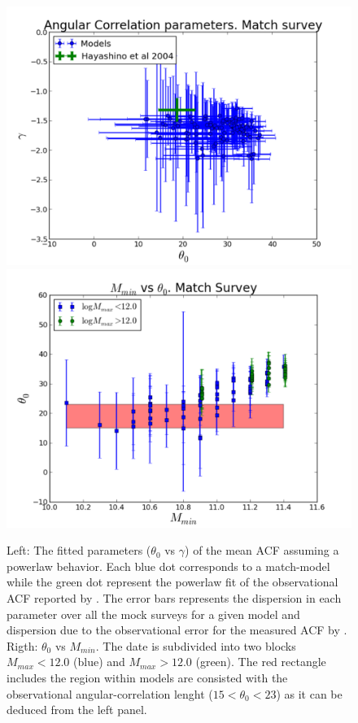 \documentclass[usenatbib]{mn2e}
\begin{document}
\begin{figure}
\begin{center}
\includegraphics[width=0.46\linewidth,angle=0]{./plots/power_law_correlation.pdf}
\hspace{5mm}
\includegraphics[width=0.46\linewidth,angle=0]{./plots/mmin_vs_correlation.pdf}
\end{center}
\caption{Left: The fitted parameters  ($\theta_{0}$ vs $\gamma$) of the 
mean ACF  assuming a powerlaw behavior. Each blue dot corresponds to a
match-model while the green dot represent the powerlaw fit of the observational
ACF reported by \citet{Hayashino2004}.  The error bars represents the dispersion
in each parameter over all the mock surveys for a given model and dispersion due
to the observational error for the measured ACF by \citet{Hayashino2004}. Rigth: 
$\theta_{0}$ vs $M_{min}$. The date is subdivided into two blocks $M_{max}<12.0$ 
(blue) and $M_{max}>12.0$ (green). The red rectangle includes the region within
models are consisted with the observational angular-correlation lenght
($15<\theta_{0}<23$) as it can be deduced from the left panel. \label{figure:correlation_parameters}} 
\end{figure} 
\end{document}
